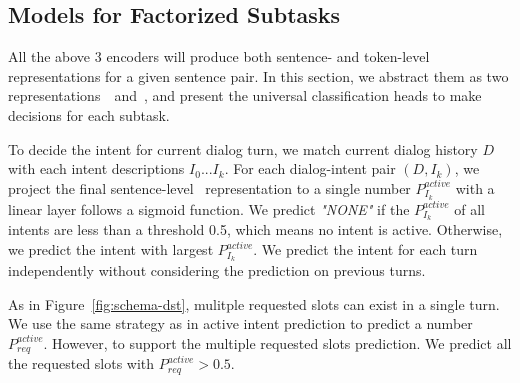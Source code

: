 \subsection{Models for Factorized Subtasks}
\label{ssec:models-overview}
All the above 3 encoders will produce both sentence- and token-level
representations for a given sentence pair. In this section,
we abstract them as two representations~\CLS~and~\TOK, and present the
universal classification heads to make decisions for each subtask.

 To decide the intent for current dialog
turn, we match current dialog history $D$ with each intent
descriptions $I_{0}...I_{k}$. For each dialog-intent pair $(D,I_{k})$,
we project the final sentence-level \CLS~representation to a single
number $P_{I_{k}}^{active}$ with a linear layer follows a sigmoid
function. We predict \textit{"NONE"} if the $P_{I_{k}}^{active}$ of
all intents are less than a threshold 0.5, which means no intent is
active. Otherwise, we predict the intent with largest
$P_{I_{k}}^{active}$. We predict the intent for each turn
independently without considering the prediction on previous turns.

 As in Figure~\ref{fig:schema-dst},
mulitple requested slots can exist in a single turn. We use the
same strategy as in active intent prediction to predict a number
$P_{req}^{active}$. However, to support the multiple requested slots
prediction. We predict all the requested slots with
$P_{req}^{active} > 0.5$.

